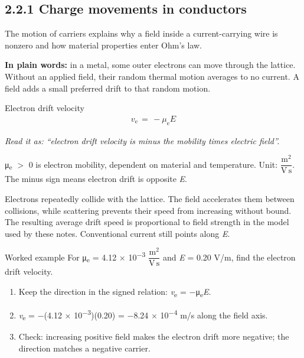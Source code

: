 \documentclass[11pt]{article}
\begin{document}
\begin{keepsection}
\section{2.2.1 Charge movements in conductors}

The motion of carriers explains why a field inside a current-carrying wire is nonzero and how material properties enter Ohm’s law.

\begin{plainbox}\textbf{In plain words:} in a metal, some outer electrons can move through the lattice. Without an applied field, their random thermal motion averages to no current. A field adds a small preferred drift to that random motion.\end{plainbox}

\begin{equationcard}{Electron drift velocity}
\[ \begin{gathered} {v}_{\mathrm{e}}\, =\, -μ_{\mathrm{e}}{E} \end{gathered} \]
{\small \emph{Read it as: “electron drift velocity is minus the mobility times electric field”.}\par μ\textsubscript{e} \ensuremath{>} 0 is electron mobility, dependent on material and temperature. Unit: {\small\ensuremath{\dfrac{\mathrm{m}^{2}}{\mathrm{V}\, \mathrm{s}}}}. The minus sign means electron drift is opposite \textit{E}.}
\end{equationcard}

Electrons repeatedly collide with the lattice. The field accelerates them between collisions, while scattering prevents their speed from increasing without bound. The resulting average drift speed is proportional to field strength in the model used by these notes. Conventional current still points along \textit{E}.

\begin{workedbox}{Worked example}
For μ\textsubscript{e} = 4.12 \ensuremath{\times} 10\textsuperscript{\ensuremath{-}3} {\small\ensuremath{\dfrac{\mathrm{m}^{2}}{\mathrm{V}\, \mathrm{s}}}} and \textit{E} = 0.20 V/m, find the electron drift velocity.

\begin{enumerate}
\item Keep the direction in the signed relation: \textit{v}\textsubscript{e} = \ensuremath{-}μ\textsubscript{e}\textit{E}.
\item \textit{v}\textsubscript{e} = \ensuremath{-}(4.12 \ensuremath{\times} 10\textsuperscript{\ensuremath{-}3})(0.20) = \ensuremath{-}8.24 \ensuremath{\times} 10\textsuperscript{\ensuremath{-}4} m/s along the field axis.
\item Check: increasing positive field makes the electron drift more negative; the direction matches a negative carrier.
\end{enumerate}
\end{workedbox}


\end{keepsection}
\end{document}
